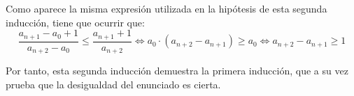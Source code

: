 \documentclass[../../main.tex]{subfiles}
\begin{document}
  Como aparece la misma expresión utilizada en la hipótesis de esta segunda inducción, tiene que ocurrir que:
  $$
  \frac{a_{n + 1} - a_0 + 1}{a_{n + 2} - a_0} \leq \frac{a_{n + 1} + 1}{a_{n + 2}} \iff a_0 \cdot (a_{n + 2} - a_{n + 1}) \geq a_0 \iff a_{n + 2} - a_{n + 1} \geq 1
  $$

  Por tanto, esta segunda inducción demuestra la primera inducción, que a su vez prueba que la desigualdad del enunciado es cierta.
\end{document}
